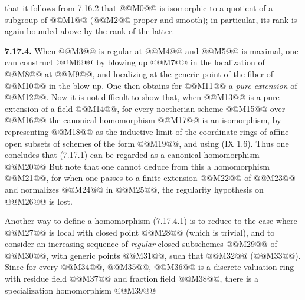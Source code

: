 that it follows from 7.16.2 that @@M0@@ is isomorphic to a quotient of a subgroup of @@M1@@ (@@M2@@ proper and smooth); in particular, its rank is again bounded above by the rank of the latter.

\textbf{7.17.4.} When @@M3@@ is regular at @@M4@@ and @@M5@@ is maximal, one can construct @@M6@@ by blowing up @@M7@@ in the localization of @@M8@@ at @@M9@@, and localizing at the generic point of the fiber of @@M10@@ in the blow-up. One then obtains for @@M11@@ a \emph{pure extension} of @@M12@@. Now it is not difficult to show that, when @@M13@@ is a pure extension of a field @@M14@@, for every noetherian scheme @@M15@@ over @@M16@@ the canonical homomorphism @@M17@@ is an isomorphism, by representing @@M18@@ as the inductive limit of the coordinate rings of affine open subsets of schemes of the form @@M19@@, and using (IX 1.6). Thus one concludes that (7.17.1) can be regarded as a canonical homomorphism
@@M20@@
But note that one cannot deduce from this a homomorphism @@M21@@, for when one passes to a finite extension @@M22@@ of @@M23@@ and normalizes @@M24@@ in @@M25@@, the regularity hypothesis on @@M26@@ is lost.

Another way to define a homomorphism (7.17.4.1) is to reduce to the case where @@M27@@ is local with closed point @@M28@@ (which is trivial), and to consider an increasing sequence of \emph{regular} closed subschemes @@M29@@ of @@M30@@, with generic points @@M31@@, such that @@M32@@ (@@M33@@). Since for every @@M34@@, @@M35@@, @@M36@@ is a discrete valuation ring with residue field @@M37@@ and fraction field @@M38@@, there is a specialization homomorphism
@@M39@@
